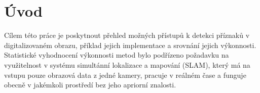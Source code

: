 

\chapter{Úvod}

Cílem této práce je poskytnout přehled možných přístupů k detekci příznaků v digitalizovaném obrazu, příklad jejich implementace a srovnání jejich výkonnosti. Statistické vyhodnocení výkonnosti metod bylo podřízeno požadavku na využitelnost v systému simultánní lokalizace a mapování (SLAM), který má na vstupu pouze obrazová data z jedné kamery, pracuje v reálném čase a funguje obecně v jakémkoli prostředí bez jeho apriorní znalosti.